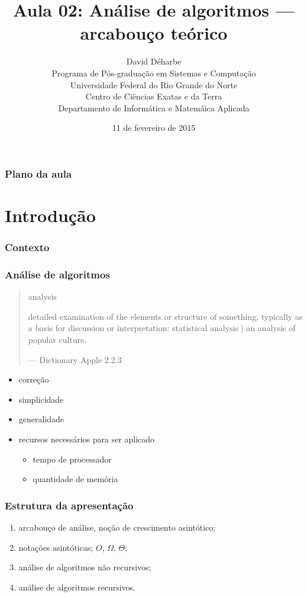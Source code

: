 \documentclass[handout]{beamer}
\title{Aula 02: Análise de algoritmos --- arcabouço teórico}
\author{David Déharbe \\
  Programa de Pós-graduação em Sistemas e Computação \\
  Universidade Federal do Rio Grande do Norte \\
  Centro de Ciências Exatas e da Terra \\
  Departamento de Informática e Matemáica Aplicada}
\date{11 de fevereiro de 2015}
\begin{document}
\begin{frame}
  \titlepage
\end{frame}

\begin{frame}
  \frametitle{Plano da aula}
  \tableofcontents
\end{frame}

\section{Introdução}

\begin{frame}

  \frametitle{Contexto}

  \begin{center}
  
  \end{center}
\end{frame}

\begin{frame}

  \frametitle{Análise de algoritmos}

  \begin{quote}

    analysis

    detailed examination of the elements or structure of something, typically as
    a basis for discussion or interpretation: statistical analysis | an analysis
    of popular culture.

    --- Dictionary Apple 2.2.3
  \end{quote}
  \pause
  \begin{itemize}
  \item correção
  \item simplicidade
  \item generalidade
  \item recursos necessários para ser aplicado 

    \begin{itemize}
    \item tempo de processador
    \item quantidade de memória
    \end{itemize}
  \end{itemize}
\end{frame}

\begin{frame}

  \frametitle{Estrutura da apresentação}

  \begin{enumerate}
  \item arcabouço de análise, noção de crescimento asintótico;
  \item notações asintóticas; $O$, $\Omega$, $\Theta$;
  \item análise de algoritmos não recursivos;
  \item análise de algoritmos recursivos.
  \end{enumerate}

\end{frame}
\end{document}
